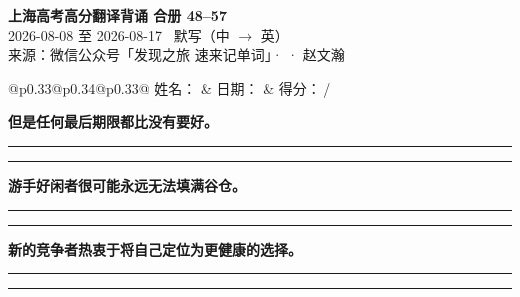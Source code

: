 \documentclass[11pt,a4paper]{article}
\newcommand{\num}[1]{\makebox[1.9em][r]{#1.}\hspace{0.3em}}
\newcommand{\wline}{\noindent\rule{\linewidth}{0.4pt}}
\begin{document}
\pagestyle{plain}
\begin{center}
{\LARGE\bfseries 上海高考高分翻译背诵 \quad 合册 48–57}\\[0.25em]
{\large 2026-08-08 至 2026-08-17 \quad\ 默写（中 $\to$ 英）}\\[0.35em]
{\footnotesize 来源：微信公众号「发现之旅 速来记单词」·  · 赵文瀚}
\end{center}

\vspace{0.4em}
\noindent\begin{tabular}{@{}p{0.33\textwidth}@{}p{0.34\textwidth}@{}p{0.33\textwidth}@{}}
姓名：\underline{\hspace{2.0cm}} & 日期：\underline{\hspace{2.0cm}} & 得分：\underline{\hspace{1.4cm}}\,/ \\
\end{tabular}

\vspace{0.5em}

\vspace{0.8em}
\vspace{0.35em}\vspace{0.15em}

\begin{minipage}{\linewidth}

\num{1}\textbf{但是任何最后期限都比没有要好。}

\vspace{0.3em}

\wline\vspace{0.3em}
\wline

\end{minipage}

\begin{minipage}{\linewidth}

\num{2}\textbf{游手好闲者很可能永远无法填满谷仓。}

\vspace{0.3em}

\wline\vspace{0.3em}
\wline

\end{minipage}

\begin{minipage}{\linewidth}

\num{3}\textbf{新的竞争者热衷于将自己定位为更健康的选择。}

\vspace{0.3em}

\wline\vspace{0.3em}
\wline

\end{minipage}
\end{document}
